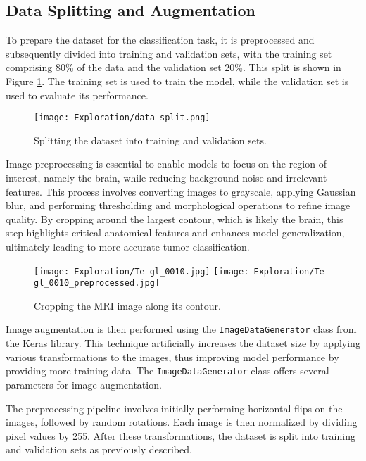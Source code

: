 \subsection{Data Splitting and Augmentation}\label{data_split_augmentation}
To prepare the dataset for the classification task, it is preprocessed and subsequently divided into training and validation sets, with the training set comprising 80\% of the data and the validation set 20\%. This split is shown in Figure \ref{fig:data_split}. The training set is used to train the model, while the validation set is used to evaluate its performance.

\begin{figure}[H]
  \begin{center}
    \texttt{[image: Exploration/data\_split.png]}
  \end{center}
  \caption{Splitting the dataset into training and validation sets.}\label{fig:data_split}
\end{figure}

Image preprocessing is essential to enable models to focus on the region of interest, namely the brain, while reducing background noise and irrelevant features. This process involves converting images to grayscale, applying Gaussian blur, and performing thresholding and morphological operations to refine image quality. By cropping around the largest contour, which is likely the brain, this step highlights critical anatomical features and enhances model generalization, ultimately leading to more accurate tumor classification.

\begin{figure}[H]
  \begin{center}
    \texttt{[image: Exploration/Te-gl\_0010.jpg]}
    \texttt{[image: Exploration/Te-gl\_0010\_preprocessed.jpg]}
  \end{center}
  \caption{Cropping the MRI image along its contour.}\label{fig:image_cropping}
\end{figure}

Image augmentation is then performed using the \texttt{ImageDataGenerator} class from the Keras library. This technique artificially increases the dataset size by applying various transformations to the images, thus improving model performance by providing more training data. The \texttt{ImageDataGenerator} class offers several parameters for image augmentation.

The preprocessing pipeline involves initially performing horizontal flips on the images, followed by random rotations. Each image is then normalized by dividing pixel values by 255. After these transformations, the dataset is split into training and validation sets as previously described.

